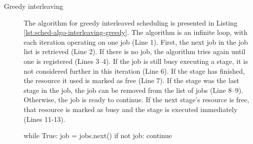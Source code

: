 \begin{description}
	\item[Greedy interleaving] The algorithm for greedy interleaved scheduling is presented in Listing \ref{lst:sched-algo-interleaving-greedy}. The algorithm is an infinite loop, with each iteration operating on one job (Line 1). First, the next job in the job list is retrieved (Line 2). If there is no job, the algorithm tries again until one is registered (Lines 3--4). If the job is still busy executing a stage, it is not considered further in this iteration (Line 6). If the stage has finished, the resource it used is marked as free (Line 7). If the stage was the last stage in the job, the job can be removed from the list of jobs (Line 8--9). Otherwise, the job is ready to continue. If the next stage's resource is free, that resource is marked as busy and the stage is executed immediately (Lines 11-13).
\begin{listing}[h]
\begin{pythoncode}
while True:
    job = jobs.next()
    if not job:
        continue


\end{pythoncode}
\end{listing}
\end{description}
